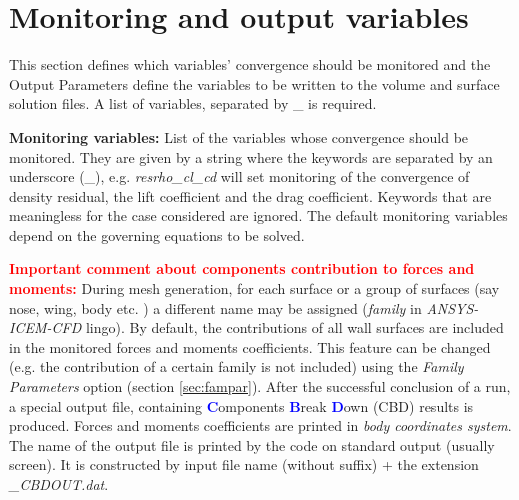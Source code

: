 \documentclass[12pt,epsf,colordvi]{article}
\begin{document}
\section{Monitoring and output variables} \label{sec:monvarout}
% 
This section defines which variables' convergence should be monitored and the Output Parameters define the variables to be written to the volume and surface solution files. 
A list of variables, separated by \_  is required.
\begin{description}
%
	\item{\bf Monitoring variables:}
List of the variables whose convergence should be monitored. They are given by a string where the keywords are separated by an underscore (\_), e.g. {\it resrho\_cl\_cd } will set monitoring of the convergence of density residual, the lift coefficient and the drag coefficient. Keywords that are meaningless for the case considered are ignored. The default monitoring variables depend on the governing equations to be solved. 

\textcolor{red}{\bf Important comment about components contribution to forces and moments:}  During mesh generation, for each surface or a group of surfaces (say nose, wing, body etc. ) a different name may be assigned ({\it family } in {\it ANSYS-ICEM-CFD} lingo). By default, the contributions of all wall surfaces are included in the monitored forces and moments coefficients. This feature can be changed (e.g. the contribution of a certain family is not included) using the {\it Family Parameters} option (section \ref{sec:fampar}). After the successful conclusion of a run, a special output file, containing \textcolor{blue}{\bf C}omponents \textcolor{blue}{\bf B}reak \textcolor{blue}{\bf D}own (CBD) results is produced. Forces and moments coefficients are printed in {\it body coordinates system}. The name of the output file is printed by the code on standard output (usually screen). It is constructed by input file name (without suffix) + the extension {\it \_CBDOUT.dat}. 


\end{description}
\end{document}
